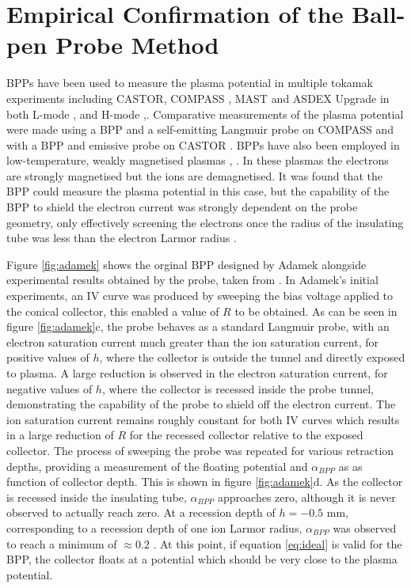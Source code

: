 \section{Empirical Confirmation of the Ball-pen Probe Method}  \label{Experiment} 
BPPs have been used to measure the plasma potential in multiple tokamak experiments including CASTOR\cite{BPP}, COMPASS \cite{BPP-COMPASS}, MAST \cite{BPP-MAST} and ASDEX Upgrade in both L-mode \cite{LandH}, \cite{L-mode} and H-mode \cite{LandH},\cite{Adamek2009}. Comparative measurements of the plasma potential were made using a BPP and a self-emitting Langmuir probe on COMPASS \cite{BPP-SEP} and with a BPP and emissive probe on CASTOR \cite{BPP-EP}. 
BPPs have also been employed in low-temperature, weakly magnetised plasmas \cite{low_temp}, \cite{low_temp2}. In these plasmas the electrons are strongly magnetised but the ions are demagnetised. It was found that the BPP could measure the plasma potential in this case, but the capability of the BPP to shield the electron current was strongly dependent on the probe geometry, only effectively screening the electrons once the radius of the insulating tube was less than the electron Larmor radius \cite{low_temp2}.



Figure \ref{fig:adamek} shows the orginal BPP designed by Adamek alongside experimental results obtained by the probe, taken from \cite{BPP}. In Adamek's initial experiments, an IV curve was produced by sweeping the bias voltage applied to the conical collector, this enabled a value of $R$ to be obtained. As can be seen in figure \ref{fig:adamek}c, the probe behaves as a standard Langmuir probe, with an electron saturation current much greater than the ion saturation current, for positive values of $h$,   where the collector is outside the tunnel and directly exposed to plasma. A large reduction is observed in the electron saturation current, for negative values of $h$, where the collector is recessed inside the probe tunnel, demonstrating the capability of the probe to shield off the electron current. The ion saturation current remains roughly constant for both IV curves which results in a large reduction of $R$ for the recessed collector relative to the exposed collector. The process of sweeping the probe was repeated for various retraction depths, providing a measurement of the floating potential and $\alpha_{BPP}$ as as function of collector depth. This is shown in figure \ref{fig:adamek}d.  As the collector is recessed inside the insulating tube, $\alpha_{BPP}$ approaches zero, although it is never observed to actually reach zero. At a recession depth of $h = -0.5$ mm, corresponding to a recession depth of one ion Larmor radius, $\alpha_{BPP}$ was observed to reach a minimum of $\approx 0.2$ . At this point, if equation \ref{eq:ideal} is valid for the BPP, the collector floats at a potential which should be very close to the plasma potential. 


